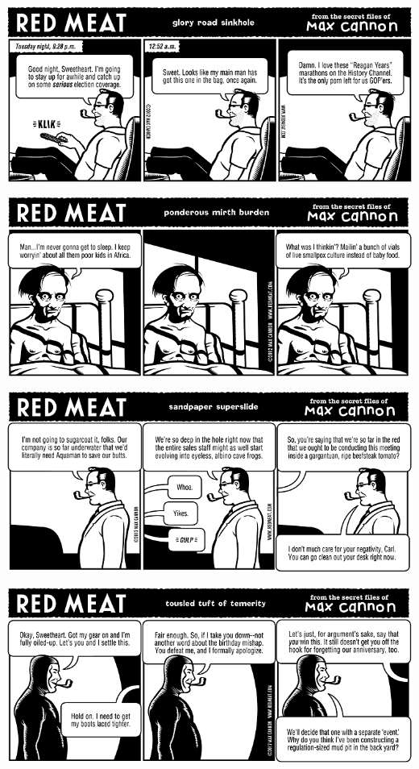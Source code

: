 \documentclass[a4paper,twoside,11pt]{article}
\begin{document}
\includegraphics[width=\textwidth]{redmeat_2012-09-18.png}



\includegraphics[width=\textwidth]{redmeat_2012-09-25.png}



\includegraphics[width=\textwidth]{redmeat_2012-10-02.png}



\includegraphics[width=\textwidth]{redmeat_2012-10-09.png}
\end{document}
